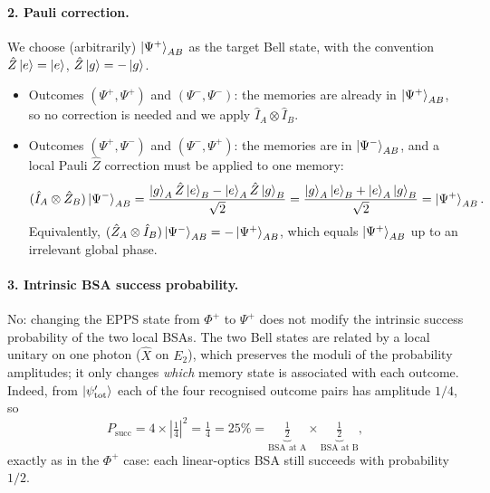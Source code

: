 \paragraph{2. Pauli correction.}
We choose (arbitrarily) $\ket{\Psi^+}_{AB}$ as the target Bell state, with the convention
$\hat Z\ket{e} = \ket{e}$, $\hat Z\ket{g} = -\ket{g}$.
\begin{itemize}
  \item Outcomes $(\Psi^+,\Psi^+)$ and $(\Psi^-,\Psi^-)$: the memories are already in $\ket{\Psi^+}_{AB}$,
        so no correction is needed and we apply $\hat I_A\otimes\hat I_B$.
  \item Outcomes $(\Psi^+,\Psi^-)$ and $(\Psi^-,\Psi^+)$: the memories are in $\ket{\Psi^-}_{AB}$, and a
        local Pauli $\hat Z$ correction must be applied to one memory:
        \begin{equation}
          (\hat I_A\otimes\hat Z_B)\ket{\Psi^-}_{AB}
          = \frac{\ket{g}_A\hat Z\ket{e}_B - \ket{e}_A\hat Z\ket{g}_B}{\sqrt2}
          = \frac{\ket{g}_A\ket{e}_B + \ket{e}_A\ket{g}_B}{\sqrt2} = \ket{\Psi^+}_{AB}.
        \end{equation}
        Equivalently, $(\hat Z_A\otimes\hat I_B)\ket{\Psi^-}_{AB} = -\ket{\Psi^+}_{AB}$, which equals
        $\ket{\Psi^+}_{AB}$ up to an irrelevant global phase.
\end{itemize}

\paragraph{3. Intrinsic BSA success probability.}
No: changing the EPPS state from $\Phi^+$ to $\Psi^+$ does not modify the intrinsic success probability
of the two local BSAs. The two Bell states are related by a local unitary on one photon
($\hat X$ on $E_2$), which preserves the moduli of the probability amplitudes; it only changes
\emph{which} memory state is associated with each outcome.
Indeed, from $\ket{\psi'_\mathrm{tot}}$ each of the four recognised outcome pairs has amplitude $1/4$, so
\begin{equation}
  P_\mathrm{succ} = 4\times\left|\tfrac14\right|^2 = \tfrac14 = 25\%
  = \underbrace{\tfrac12}_{\text{BSA at A}}\times\underbrace{\tfrac12}_{\text{BSA at B}},
\end{equation}
exactly as in the $\Phi^+$ case: each linear-optics BSA still succeeds with probability $1/2$.
